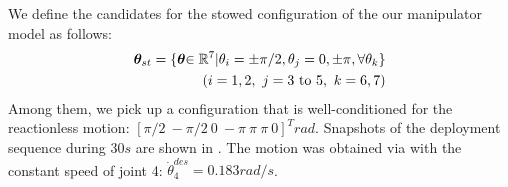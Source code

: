 We define the candidates for the stowed configuration of the our manipulator model as follows:
%
\begin{align}
  {\bm{\theta}}_{st} = \{{\bm{\theta}}{\in\mathbb{R}^{7}} | \theta_{i} = \pm \pi/2, \theta_{j} = 0,\pm \pi, \forall \theta_{k}\}\notag\\
  (i = 1,2,~j = 3~\mathrm{to}~5,~k = 6,7)
\end{align}
%
Among them, we pick up a configuration that is well-conditioned for the reactionless motion:
$[\pi/2~-\pi/2~0~-\pi~\pi~\pi~0]^{T}\unit{rad}$.
Snapshots of the deployment sequence during $30\unit{s}$ are shown in .
The motion was obtained via 
with the constant speed of joint 4: $\dot{\theta}_{4}^{des} = 0.183\unit{rad/s}$.
%

